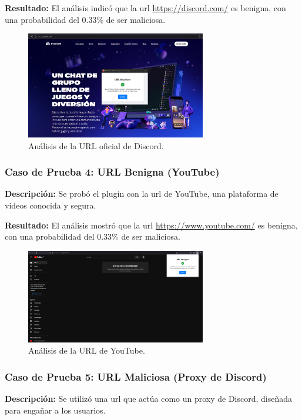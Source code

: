 \textbf{Resultado:}
El análisis indicó que la \gls{url} \url{https://discord.com/} es benigna, con una probabilidad del 0.33\% de ser maliciosa.

\begin{figure}[H]
    \centering
    \includegraphics[width=0.7\textwidth]{image3.png}
    \caption{Análisis de la URL oficial de Discord.}
    \label{fig:discord}
\end{figure}

\subsubsection*{Caso de Prueba 4: URL Benigna (YouTube)}
\textbf{Descripción:}
Se probó el plugin con la \gls{url} de YouTube, una plataforma de videos conocida y segura.

\textbf{Resultado:}
El análisis mostró que la \gls{url} \url{https://www.youtube.com/} es benigna, con una probabilidad del 0.33\% de ser maliciosa.

\begin{figure}[H]
    \centering
    \includegraphics[width=0.7\textwidth]{image4.png}
    \caption{Análisis de la URL de YouTube.}
    \label{fig:youtube}
\end{figure}

\subsubsection*{Caso de Prueba 5: URL Maliciosa (Proxy de Discord)}
\textbf{Descripción:}
Se utilizó una \gls{url} que actúa como un proxy de Discord, diseñada para engañar a los usuarios.

